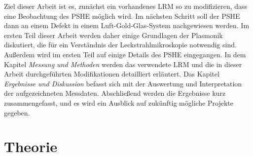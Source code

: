 \documentclass[titlepage,  ngerman]{article}
\begin{document}
	Ziel dieser Arbeit ist es, zunächst ein vorhandenes LRM so zu modifizieren, dass eine Beobachtung des PSHE möglich wird. Im nächsten Schritt soll der PSHE dann an einem Defekt in einem Luft-Gold-Glas-System nachgewiesen werden. Im ersten Teil dieser Arbeit werden daher einige Grundlagen der Plasmonik diskutiert, die für ein Verständnis der Leckstrahlmikroskopie notwendig sind. Außerdem wird im ersten Teil auf einige Details des PSHE eingegangen. In dem Kapitel \textit{Messung und Methoden} werden das verwendete LRM und die in dieser Arbeit durchgeführten Modifikationen detailliert erläutert. Das Kapitel \textit{Ergebnisse und Diskussion} befasst sich mit der Auswertung und Interpretation der aufgezeichneten Messdaten. Abschließend werden die Ergebnisse kurz zusammengefasst, und es wird ein Ausblick auf zukünftig mögliche Projekte gegeben.
	
	\newpage	
	\section{Theorie}
\end{document}

